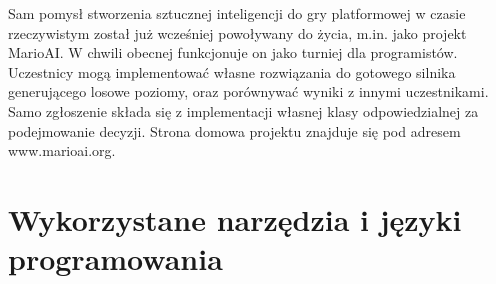 \begin{par}
	Sam pomysł stworzenia sztucznej inteligencji do gry platformowej w czasie rzeczywistym został już wcześniej powoływany do życia, m.in. jako projekt MarioAI. 
	W chwili obecnej funkcjonuje on jako turniej dla programistów. 
	Uczestnicy mogą implementować własne rozwiązania do gotowego silnika generującego losowe poziomy, oraz porównywać wyniki z innymi uczestnikami.
	Samo zgłoszenie składa się z implementacji własnej klasy odpowiedzialnej za podejmowanie decyzji.
	Strona domowa projektu znajduje się pod adresem www.marioai.org.
\end{par}

\section{Wykorzystane narzędzia i języki programowania}
